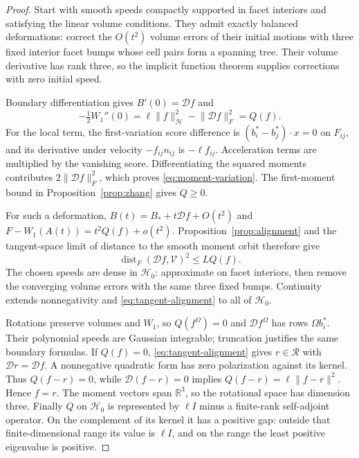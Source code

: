\documentclass[11pt,reqno]{amsart}
\theoremstyle{remark}
\newcommand{\R}{\mathbb R}
\newcommand{\norm}[1]{\lVert #1\rVert}
\newcommand{\HH}{\mathcal H}
\newcommand{\DD}{\mathcal D}
\newcommand{\VV}{\mathcal V}
\newcommand{\RR}{\mathcal R}
\DeclareMathOperator{\dist}{dist}
\begin{document}
\begin{proof}
Start with smooth speeds compactly supported in facet interiors and
satisfying the linear volume conditions. They admit exactly balanced
deformations: correct the $O(t^2)$ volume errors of their initial motions
with three fixed interior facet bumps whose cell pairs form a spanning
tree. Their volume derivative has rank three, so the implicit function
theorem supplies corrections with zero initial speed.

Boundary differentiation gives $B'(0)=\DD f$ and
\begin{equation}\label{eq:moment-variation}
 -\tfrac12 W_1''(0)=\ell\norm{f}_{\HH}^2-\norm{\DD f}_F^2=Q(f).
\end{equation}
For the local term, the first-variation score difference is
$(b_i^*-b_j^*)\cdot x=0$ on $F_{ij}$, and its derivative under velocity
$-f_{ij}n_{ij}$ is $-\ell f_{ij}$. Acceleration terms are multiplied
by the vanishing score. Differentiating the squared moments contributes
$2\norm{\DD f}_F^2$, which proves \eqref{eq:moment-variation}.
The first-moment bound in Proposition~\ref{prop:zhang} gives $Q\ge0$.

For such a deformation,
$B(t)=B_*+t\DD f+O(t^2)$ and $F-W_1(A(t))=t^2Q(f)+o(t^2)$.
Proposition~\ref{prop:alignment} and the tangent-space limit of distance
to the smooth moment orbit therefore give
\begin{equation}\label{eq:tangent-alignment}
 \dist_F(\DD f,\VV)^2\le LQ(f).
\end{equation}
The chosen speeds are dense in $\HH_0$: approximate on facet interiors,
then remove the converging volume errors with the same three fixed bumps.
Continuity extends nonnegativity and \eqref{eq:tangent-alignment} to
all of $\HH_0$.

Rotations preserve volumes and $W_1$, so $Q(f^\Omega)=0$ and
$\DD f^\Omega$ has rows $\Omega b_i^*$. Their polynomial speeds are
Gaussian integrable; truncation justifies the same boundary formulas.
If $Q(f)=0$, \eqref{eq:tangent-alignment} gives $r\in\RR$ with
$\DD r=\DD f$. A nonnegative quadratic form has zero polarization
against its kernel. Thus $Q(f-r)=0$, while $\DD(f-r)=0$ implies
$Q(f-r)=\ell\norm{f-r}^2$. Hence $f=r$.
The moment vectors span $\R^3$, so the rotational space has dimension three.
Finally $Q$ on $\HH_0$ is represented by $\ell I$ minus a finite-rank
self-adjoint operator. On the complement of its kernel it has a positive
gap: outside that finite-dimensional range its value is $\ell I$, and
on the range the least positive eigenvalue is positive.
\end{proof}
\end{document}
